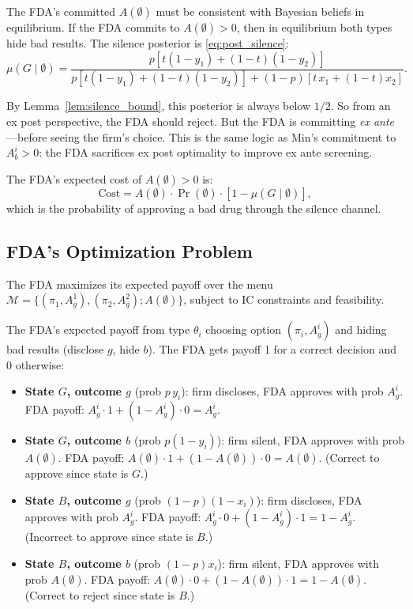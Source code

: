 \documentclass[12pt,a4paper]{article}
\begin{document}
The FDA's committed $A(\emptyset)$ must be consistent with
Bayesian beliefs in equilibrium. If the FDA commits to
$A(\emptyset) > 0$, then in equilibrium both types hide bad
results. The silence posterior is
\eqref{eq:post_silence}:
\begin{equation}\label{eq:consistency}
  \mu(G \mid \emptyset)
  = \frac{p \left[t(1-y_1) + (1-t)(1-y_2)\right]}
         {p \left[t(1-y_1) + (1-t)(1-y_2)\right]
          + (1-p)\left[t \, x_1 + (1-t) x_2\right]}.
\end{equation}

By Lemma~\ref{lem:silence_bound}, this posterior is always
below $1/2$. So from an ex post perspective, the FDA should
reject. But the FDA is committing \emph{ex ante}---before
seeing the firm's choice. This is the same logic as Min's
commitment to $A_b^i > 0$: the FDA sacrifices ex post
optimality to improve ex ante screening.

The FDA's expected cost of $A(\emptyset) > 0$ is:
\begin{equation}\label{eq:fda_cost_silence}
  \text{Cost} = A(\emptyset) \cdot \Pr(\emptyset)
    \cdot \left[1 - \mu(G \mid \emptyset)\right],
\end{equation}
which is the probability of approving a bad drug through the
silence channel.


\subsection{FDA's Optimization Problem}
\label{sec:fda_problem}

The FDA maximizes its expected payoff over the menu
$\mathcal{M} = \{(\pi_1, A_g^1), (\pi_2, A_g^2);
A(\emptyset)\}$, subject to IC constraints and feasibility.

The FDA's expected payoff from type $\theta_i$ choosing option
$(\pi_i, A_g^i)$ and hiding bad results (disclose $g$, hide
$b$). The FDA gets payoff 1 for a correct decision and 0
otherwise:

\begin{itemize}
  \item \textbf{State $G$, outcome $g$} (prob $p \, y_i$):
    firm discloses, FDA approves with prob $A_g^i$.
    FDA payoff: $A_g^i \cdot 1 + (1-A_g^i) \cdot 0 = A_g^i$.
  \item \textbf{State $G$, outcome $b$} (prob $p(1-y_i)$):
    firm silent, FDA approves with prob $A(\emptyset)$.
    FDA payoff: $A(\emptyset) \cdot 1 + (1-A(\emptyset))
    \cdot 0 = A(\emptyset)$.
    (Correct to approve since state is $G$.)
  \item \textbf{State $B$, outcome $g$} (prob $(1-p)(1-x_i)$):
    firm discloses, FDA approves with prob $A_g^i$.
    FDA payoff: $A_g^i \cdot 0 + (1-A_g^i) \cdot 1
    = 1 - A_g^i$.
    (Incorrect to approve since state is $B$.)
  \item \textbf{State $B$, outcome $b$} (prob $(1-p) x_i$):
    firm silent, FDA approves with prob $A(\emptyset)$.
    FDA payoff: $A(\emptyset) \cdot 0 + (1-A(\emptyset))
    \cdot 1 = 1 - A(\emptyset)$.
    (Correct to reject since state is $B$.)
\end{itemize}
\end{document}
